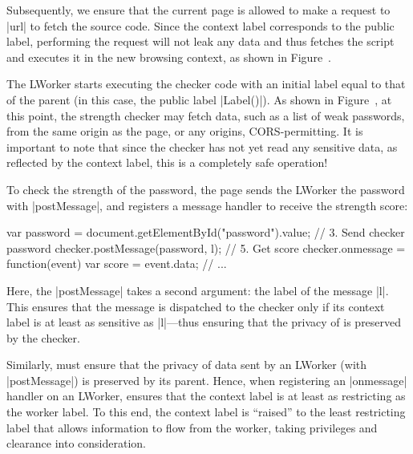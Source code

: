 Subsequently, we ensure that the current page is allowed to make a
request to \js|url| to fetch the source code.
%
Since the context label corresponds to the public label, performing
the request will not leak any data and thus \sys{} fetches the script
and executes it in the new browsing context, as shown in
Figure~.

The LWorker starts executing the checker code with an initial label
equal to that of the parent (in this case, the public label
\js|Label()|).
%
As shown in Figure~, at this point, the strength
checker may fetch data, such as a list of weak passwords, from the
same origin as the page, or any origins, CORS-permitting.
%
It is important to note that since the checker has not yet read any
sensitive data, as reflected by the context label, this is a
completely safe operation!

To check the strength of the password, the page sends the LWorker the
password with \js|postMessage|, and registers a message handler to
receive the strength score:
\begin{jscode}
var password = 
 document.getElementById("password").value;
// 3. Send checker password 
checker.postMessage(password, l);
// 5. Get score
checker.onmessage = function(event) {
  var score = event.data; 
  // ...
}
\end{jscode}
Here, the \js|postMessage| takes a second argument: the label of the
message \js|l|.
%
This ensures that the message is dispatched to the checker only if its
context label is at least as sensitive as \js|l|---thus ensuring
that the privacy of  is preserved by the checker.

Similarly, \sys{} must ensure that the privacy of data sent by an
LWorker (with \js|postMessage|) is preserved by its parent.
%
Hence, when registering an \js|onmessage| handler on an LWorker,
\sys{} ensures that the context label is at least as restricting as
the worker label.
%
To this end, the context label is ``raised'' to the least restricting
label that allows information to flow from the worker, taking
privileges and clearance into consideration.

